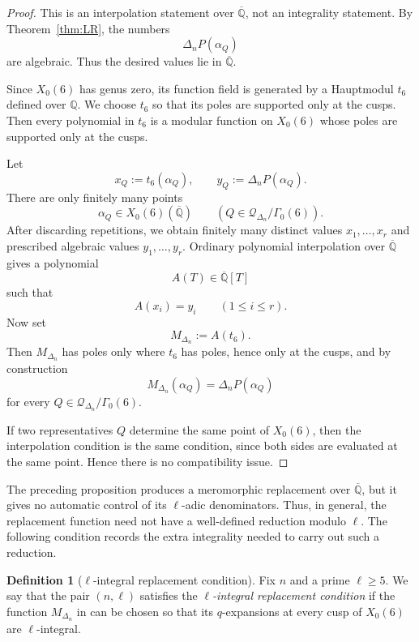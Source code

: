\documentclass[12pt]{amsart}
\theoremstyle{definition}
\newtheorem{definition}[theorem]{Definition}
\theoremstyle{remark}
\begin{document}
\begin{proof}
This is an interpolation statement over $\overline{\mathbb{Q}}$, not an
integrality statement.  By Theorem~\ref{thm:LR}, the numbers
\[
        \Delta_n P(\alpha_Q)
\]
are algebraic.  Thus the desired values lie in $\overline{\mathbb{Q}}$.

Since $X_0(6)$ has genus zero, its function field is generated by a
Hauptmodul $t_6$ defined over $\mathbb{Q}$.  We choose $t_6$ so that its
poles are supported only at the cusps.  Then every polynomial in $t_6$
is a modular function on $X_0(6)$ whose poles are supported only at the
cusps.

Let
\[
        x_Q:=t_6(\alpha_Q),
        \qquad
        y_Q:=\Delta_n P(\alpha_Q).
\]
There are only finitely many points
\[
        \alpha_Q\in X_0(6)(\overline{\mathbb{Q}})
        \qquad
        (Q\in \mathcal{Q}_{\Delta_n}/\Gamma_0(6)).
\]
After discarding repetitions, we obtain finitely many distinct values
$x_1,\ldots,x_r$ and prescribed algebraic values
$y_1,\ldots,y_r$.  Ordinary polynomial interpolation over
$\overline{\mathbb{Q}}$ gives a polynomial
\[
        A(T)\in \overline{\mathbb{Q}}[T]
\]
such that
\[
        A(x_i)=y_i
        \qquad (1\leq i\leq r).
\]
Now set
\[
        M_{\Delta_n}:=A(t_6).
\]
Then $M_{\Delta_n}$ has poles only where $t_6$ has poles, hence only at
the cusps, and by construction
\[
        M_{\Delta_n}(\alpha_Q)=\Delta_n P(\alpha_Q)
\]
for every $Q\in \mathcal{Q}_{\Delta_n}/\Gamma_0(6)$.

If two representatives $Q$ determine the same point of $X_0(6)$, then
the interpolation condition is the same condition, since both sides are
evaluated at the same point.  Hence there is no compatibility issue.
\end{proof}

The preceding proposition produces a meromorphic replacement over
$\overline{\mathbb{Q}}$, but it gives no automatic control of its
$\ell$-adic denominators.  Thus, in general, the replacement function
need not have a well-defined reduction modulo $\ell$.  The following
condition records the extra integrality needed to carry out such a
reduction.


\begin{definition}[$\ell$-integral replacement condition]\label{def:irc}
Fix $n$ and a prime $\ell\ge5$. We say that the pair $(n,\ell)$ satisfies
the {\it $\ell$-integral replacement condition} if the function $M_{\Delta_n}$ in
 can be chosen so that its $q$-expansions at every cusp of $X_0(6)$ are
$\ell$-integral.
\end{definition}
\end{document}
